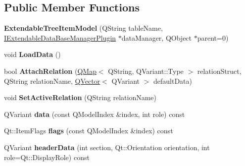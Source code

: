 \subsection*{Public Member Functions}
\begin{DoxyCompactItemize}
\item 
{\bfseries Extendable\+Tree\+Item\+Model} (Q\+String table\+Name, \hyperlink{class_i_extendable_data_base_manager_plugin}{I\+Extendable\+Data\+Base\+Manager\+Plugin} $\ast$data\+Manager, Q\+Object $\ast$parent=0)\hypertarget{class_extendable_tree_item_model_a44c736cca0dde9d9ca5c295ebc85fdfe}{}\label{class_extendable_tree_item_model_a44c736cca0dde9d9ca5c295ebc85fdfe}

\item 
void {\bfseries Load\+Data} ()\hypertarget{class_extendable_tree_item_model_acb01ad7e561a6471b7361ea50fe84c01}{}\label{class_extendable_tree_item_model_acb01ad7e561a6471b7361ea50fe84c01}

\item 
bool {\bfseries Attach\+Relation} (\hyperlink{class_q_map}{Q\+Map}$<$ Q\+String, Q\+Variant\+::\+Type $>$ relation\+Struct, Q\+String relation\+Name, \hyperlink{class_q_vector}{Q\+Vector}$<$ Q\+Variant $>$ default\+Data)\hypertarget{class_extendable_tree_item_model_ac5899069b1919eaa044e729f8a19ef93}{}\label{class_extendable_tree_item_model_ac5899069b1919eaa044e729f8a19ef93}

\item 
void {\bfseries Set\+Active\+Relation} (Q\+String relation\+Name)\hypertarget{class_extendable_tree_item_model_afdfd8ef7a227883e0d6b8916690ab383}{}\label{class_extendable_tree_item_model_afdfd8ef7a227883e0d6b8916690ab383}

\item 
Q\+Variant {\bfseries data} (const Q\+Model\+Index \&index, int role) const \hypertarget{class_extendable_tree_item_model_ab43719bc7e2e260580d03a272166335a}{}\label{class_extendable_tree_item_model_ab43719bc7e2e260580d03a272166335a}

\item 
Qt\+::\+Item\+Flags {\bfseries flags} (const Q\+Model\+Index \&index) const \hypertarget{class_extendable_tree_item_model_a95a04407e8dfe9bb21abc500cb931b35}{}\label{class_extendable_tree_item_model_a95a04407e8dfe9bb21abc500cb931b35}

\item 
Q\+Variant {\bfseries header\+Data} (int section, Qt\+::\+Orientation orientation, int role=Qt\+::\+Display\+Role) const \hypertarget{class_extendable_tree_item_model_ac50aecb40d68743484d2b94af2335da4}{}\label{class_extendable_tree_item_model_ac50aecb40d68743484d2b94af2335da4}


\end{DoxyCompactItemize}
